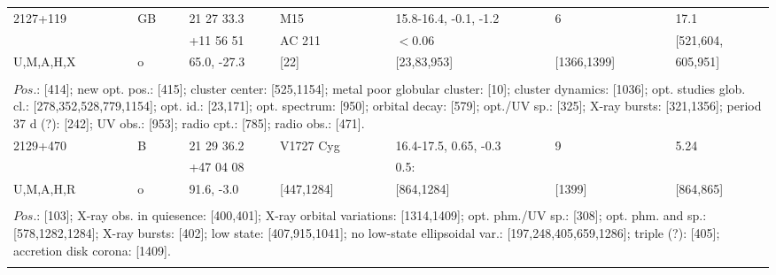 \documentclass{aa}
\begin{document}
\begin{tabular}{p{2.5cm}p{1cm}p{1.8cm}p{2.3cm}p{3.3cm}p{2.0cm}p{2.2cm}}
\noalign{\smallskip}
2127+119         & GB            & 21 27 33.3            & M15                  & 15.8-16.4, -0.1, -1.2   & 6                     & 17.1             \\
                           &                    & +11 56 51             &  AC 211           & $<$0.06                       &                        & [521,604,    \\
U,M,A,H,X        & o                & 65.0, -27.3            & [22]                   & [23,83,953]                 & [1366,1399]  & 605,951]      \\
\\
\multicolumn{7}{p{17.5cm}}{
$Pos$.: [414]; new opt. pos.: [415]; cluster center: [525,1154]; metal poor globular cluster: [10]; cluster dynamics: [1036]; 
opt. studies glob. cl.: [278,352,528,779,1154]; opt. id.: [23,171]; opt. spectrum: [950]; orbital decay: [579]; opt./UV sp.: [325]; 
X-ray bursts: [321,1356]; period 37 d (?): [242]; UV obs.: [953]; radio cpt.: [785]; 
radio obs.: [471].}\\
\noalign{\smallskip}
\hline

\noalign{\smallskip}
2129+470             & B              & 21 29 36.2            & V1727 Cyg        & 16.4-17.5, 0.65, -0.3        & 9                 & 5.24         \\
                               &                  & +47 04 08             &                              & 0.5:                                     &                    &                 \\
U,M,A,H,R            & o              & 91.6, -3.0              & [447,1284]          & [864,1284]                        & [1399]        & [864,865]  \\
\\
\multicolumn{7}{p{17.5cm}}{
$Pos$.: [103]; X-ray obs. in quiesence: [400,401]; X-ray orbital variations: [1314,1409]; opt. phm./UV sp.: [308]; 
opt. phm. and sp.: [578,1282,1284]; X-ray bursts: [402]; low state: 
[407,915,1041]; no low-state ellipsoidal var.: [197,248,405,659,1286]; triple (?): [405]; accretion disk corona: [1409].}\\
\noalign{\smallskip}
\hline


\end{tabular}
\end{document}
